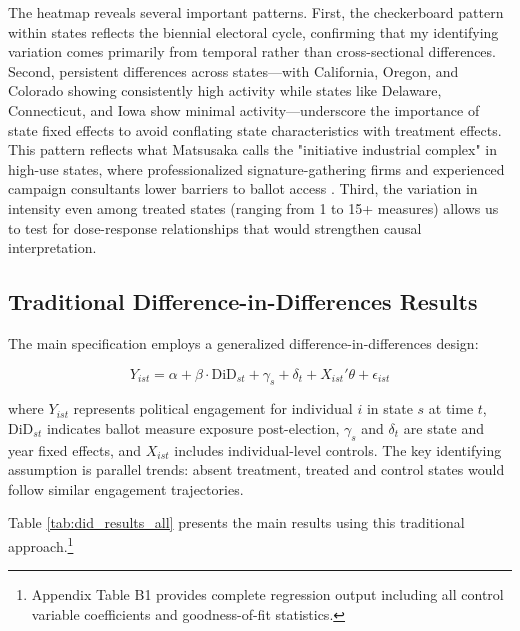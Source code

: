 \documentclass[12pt,letterpaper,oneside]{book}
\begin{document}
The heatmap reveals several important patterns. First, the checkerboard pattern within states reflects the biennial electoral cycle, confirming that my identifying variation comes primarily from temporal rather than cross-sectional differences. Second, persistent differences across states---with California, Oregon, and Colorado showing consistently high activity while states like Delaware, Connecticut, and Iowa show minimal activity---underscore the importance of state fixed effects to avoid conflating state characteristics with treatment effects. This pattern reflects what Matsusaka calls the "initiative industrial complex" in high-use states, where professionalized signature-gathering firms and experienced campaign consultants lower barriers to ballot access \citep{matsusaka2018public}. Third, the variation in intensity even among treated states (ranging from 1 to 15+ measures) allows us to test for dose-response relationships that would strengthen causal interpretation.

\subsection{Traditional Difference-in-Differences Results}

The main specification employs a generalized difference-in-differences design:

$$ Y_{ist} = \alpha + \beta \cdot \text{DiD}_{st} + \gamma_s + \delta_t + X_{ist}'\theta + \epsilon_{ist} $$

where $Y_{ist}$ represents political engagement for individual $i$ in state $s$ at time $t$, $\text{DiD}_{st}$ indicates ballot measure exposure post-election, $\gamma_s$ and $\delta_t$ are state and year fixed effects, and $X_{ist}$ includes individual-level controls. The key identifying assumption is parallel trends: absent treatment, treated and control states would follow similar engagement trajectories.

Table \ref{tab:did_results_all} presents the main results using this traditional approach.\footnote{Appendix Table B1 provides complete regression output including all control variable coefficients and goodness-of-fit statistics.}
\end{document}
